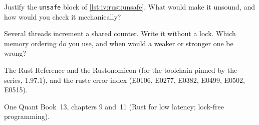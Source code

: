 \begin{interviewq}\label{iq:iv:rust:12}
Justify the \texttt{unsafe} block of \cref{lst:iv:rust:unsafe}. What would make it unsound, and how would you check it
mechanically?
\end{interviewq}

\begin{interviewq}\label{iq:iv:rust:13}
Several threads increment a shared counter. Write it without a lock. Which memory ordering do you use, and when would a weaker
or stronger one be wrong?
\end{interviewq}

\begin{omsources}
\item The Rust Reference and the Rustonomicon (for the toolchain pinned by the series, 1.97.1), and the rustc error index
(E0106, E0277, E0382, E0499, E0502, E0515).
\item One Quant Book~13, chapters 9 and~11 (Rust for low latency; lock-free programming).
\end{omsources}
